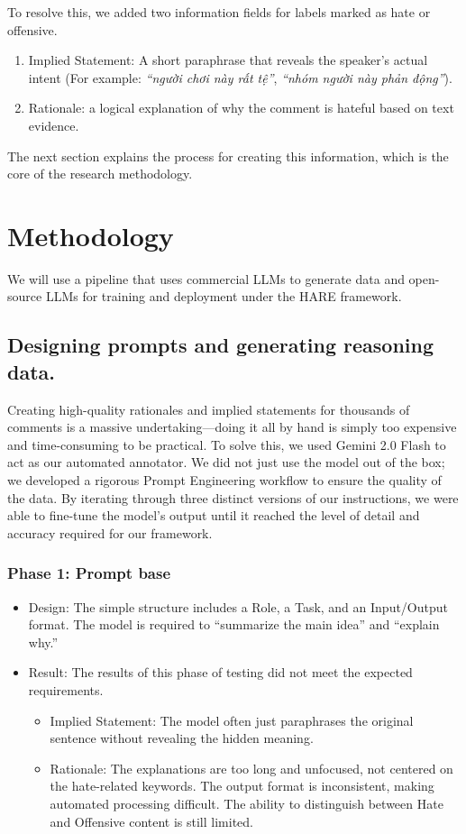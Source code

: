 \documentclass[11pt]{article}
\begin{document}
To resolve this, we added two information fields for labels marked as hate or offensive.
\begin{enumerate}[leftmargin=*]
\item Implied Statement: A short paraphrase that reveals the speaker's actual intent (For
example: \foreignlanguage{vietnamese}{\textit{``người chơi này rất tệ''}}, \foreignlanguage{vietnamese}{\textit{``nhóm người này phản động''}}).
\item Rationale: a logical explanation of why the comment is hateful based on text evidence.
\end{enumerate}
The next section explains the process for creating this information, which is the core of the
research methodology.

\section{Methodology}
We will use a pipeline that uses commercial LLMs to generate data and open-source LLMs for
training and deployment under the HARE framework.

\subsection{Designing prompts and generating reasoning data.}
Creating high-quality rationales and implied statements for thousands of comments is a
massive undertaking—doing it all by hand is simply too expensive and time-consuming to be
practical. To solve this, we used Gemini 2.0 Flash \citep{google2025gemini2flash} to act as our automated annotator. We
did not just use the model out of the box; we developed a rigorous Prompt Engineering
workflow to ensure the quality of the data. By iterating through three distinct versions of our
instructions, we were able to fine-tune the model's output until it reached the level of detail
and accuracy required for our framework.

\subsubsection{Phase 1: Prompt base}
\begin{itemize}[leftmargin=*]
\item Design: The simple structure includes a Role, a Task, and an Input/Output format. The
model is required to ``summarize the main idea'' and ``explain why.''
\item Result: The results of this phase of testing did not meet the expected requirements.
\begin{itemize}[leftmargin=*]
\item Implied Statement: The model often just paraphrases the original sentence
without revealing the hidden meaning.
\item Rationale: The explanations are too long and unfocused, not centered on the
hate-related keywords. The output format is inconsistent, making automated
processing difficult. The ability to distinguish between Hate and Offensive content
is still limited.
\end{itemize}
\end{itemize}
\end{document}
